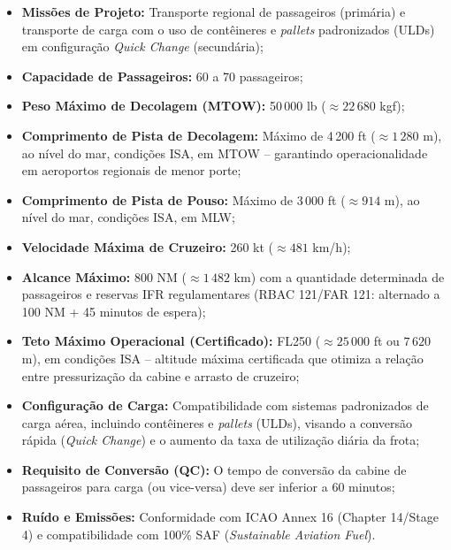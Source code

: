 \begin{itemize}
    \item \textbf{Missões de Projeto:} Transporte regional de passageiros (primária) e transporte de carga com o uso de contêineres e \textit{pallets} padronizados (ULDs) em configuração \textit{Quick Change} (secundária);
    
    
    \item \textbf{Capacidade de Passageiros:} 60 a 70 passageiros;
    
    \item \textbf{Peso Máximo de Decolagem (MTOW):} 50\,000 lb ($\approx 22\,680$ kgf);
    
    \item \textbf{Comprimento de Pista de Decolagem:} Máximo de 4\,200 ft ($\approx 1\,280$ m), ao nível do mar, condições ISA, em MTOW -- garantindo operacionalidade em aeroportos regionais de menor porte;
    
    \item \textbf{Comprimento de Pista de Pouso:} Máximo de 3\,000 ft ($\approx 914$ m), ao nível do mar, condições ISA, em MLW;
    
    \item \textbf{Velocidade Máxima de Cruzeiro:} 260 kt ($\approx 481$ km/h);
    
    \item \textbf{Alcance Máximo:} 800 NM ($\approx 1\,482$ km) com a quantidade determinada de passageiros e reservas IFR regulamentares (RBAC 121/FAR 121: alternado a 100 NM + 45 minutos de espera);
    
    \item \textbf{Teto Máximo Operacional (Certificado):} FL250 ($\approx 25\,000$ ft ou $7\,620$ m), em condições ISA -- altitude máxima certificada que otimiza a relação entre pressurização da cabine e arrasto de cruzeiro;
    
    \item \textbf{Configuração de Carga:} Compatibilidade com sistemas padronizados de carga aérea, incluindo contêineres e \textit{pallets} (ULDs), visando a conversão rápida (\textit{Quick Change}) e o aumento da taxa de utilização diária da frota;

    \item \textbf{Requisito de Conversão (QC):} O tempo de conversão da cabine de passageiros para carga (ou vice-versa) deve ser inferior a 60 minutos;

    \item \textbf{Ruído e Emissões:} Conformidade com ICAO Annex 16 (Chapter 14/Stage 4) e compatibilidade com 100\% SAF (\textit{Sustainable Aviation Fuel}).
\end{itemize}

